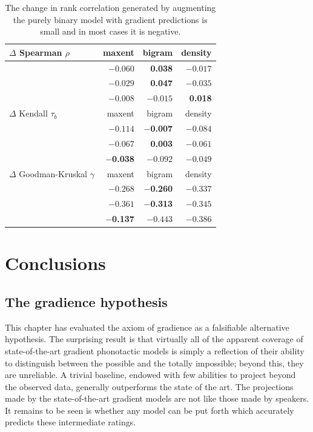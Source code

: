 \begin{table} 
\centering
\begin{tabular}{l r r r}
\toprule
$\Delta$ Spearman $\rho$          & maxent            & bigram            & density  \\
\midrule
\citealt{Greenberg1964}  & $-0.060$          &  \textbf{0.038} & $-0.017$ \\
\citealt{Scholes1966}    & $-0.029$          &  \textbf{0.047} & $-0.035$ \\
\citealt{Albright2003b}  & $-0.008$          & $-0.015$          & \textbf{0.018} \\
\midrule
$\Delta$ Kendall $\tau_b$         & maxent            & bigram            & density  \\
\midrule
\citealt{Greenberg1964}  & $-0.114$          & \textbf{$-$0.007} & $-0.084$ \\
\citealt{Scholes1966}    & $-0.067$          & \textbf{0.003}  & $-0.061$ \\
\citealt{Albright2003b}  & \textbf{$-$0.038} & $-0.092$          & $-0.049$ \\
\midrule
$\Delta$ Goodman-Kruskal $\gamma$ & maxent            & bigram            & density  \\
\midrule
\citealt{Greenberg1964}  & $-0.268$          & \textbf{$-$0.260} & $-0.337$ \\
\citealt{Scholes1966}    & $-0.361$          & \textbf{$-$0.313} & $-0.345$ \\
\citealt{Albright2003b}  & \textbf{$-$0.137} & $-0.443$          & $-0.386$ \\
\bottomrule
\end{tabular}
\caption{The change in rank correlation generated by augmenting the purely binary model with gradient predictions is small and in most cases it is negative.}
\label{controlled}
\end{table}

\section{Conclusions}

\subsection{The gradience hypothesis}

This chapter has evaluated the axiom of gradience as a falsifiable alternative hypothesis. The surprising result is that virtually all of the apparent coverage of state-of-the-art gradient phonotactic models is simply a reflection of their ability to distinguish between the possible and the totally impossible; beyond this, they are unreliable. A trivial baseline, endowed with few abilities to project beyond the observed data, generally outperforms the state of the art. The projections made by the state-of-the-art gradient models are not like those made by speakers. It remains to be seen is whether any model can be put forth which accurately predicts these intermediate ratings.

